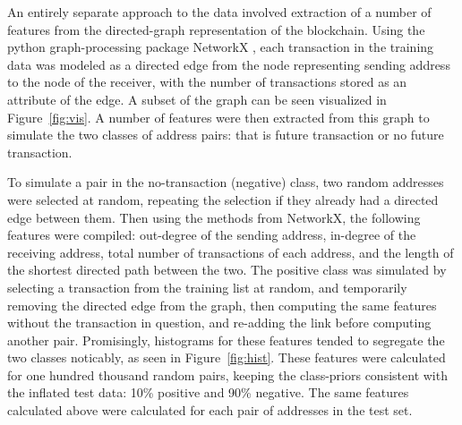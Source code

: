 \documentclass{article} %
\begin{document}
An entirely separate approach to the data involved extraction of a number of features from the directed-graph representation of the blockchain.  Using the python graph-processing package NetworkX \cite{nx}, each transaction in the training data was modeled as a directed edge from the node representing sending address to the node of the receiver, with the number of transactions stored as an attribute of the edge.  A subset of the graph can be seen visualized in Figure~\ref{fig:vis}. A number of features were then extracted from this graph to simulate the two classes of address pairs: that is future transaction or no future transaction.

To simulate a pair in the no-transaction (negative) class, two random addresses were selected at random, repeating the selection if they already had a directed edge between them.  Then using the methods from NetworkX, the following features were compiled: out-degree of the sending address, in-degree of the receiving address, total number of transactions of each address, and the length of the shortest directed path between the two.  The positive class was simulated by selecting a transaction from the training list at random, and temporarily removing the directed edge from the graph, then computing the same features without the transaction in question, and re-adding the link before computing another pair.  Promisingly, histograms for these features tended to segregate the two classes noticably, as seen in Figure~\ref{fig:hist}.  These features were calculated for one hundred thousand random pairs, keeping the class-priors consistent with the inflated test data: 10\% positive and 90\% negative.  The same features calculated above were calculated for each pair of addresses in the test set.  
\end{document}

